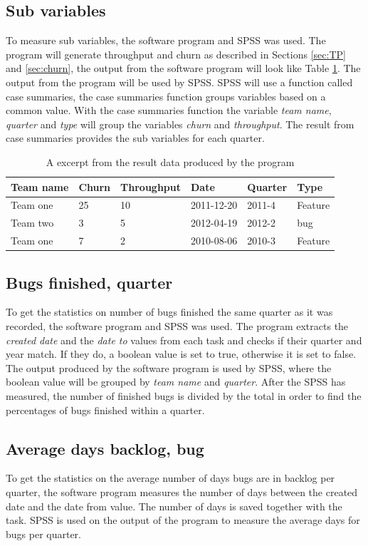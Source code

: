 \documentclass[UKenglish]{ifimaster}  %
\begin{document}
\subsection {Sub variables}
\label{sec:bug}
To measure sub variables, the software program and SPSS was used. The program will generate throughput and churn as described in Sections \ref{sec:TP} and \ref{sec:churn}, the output from the software program will look like Table \ref{tab:ftb}. The output from the program will be used by SPSS. SPSS will use a function called case summaries, the case summaries function groups variables based on a common value.  With the case summaries function the variable \textit{team name}, \textit{quarter} and \textit{type} will group the variables \textit{churn} and \textit{throughput}. The result from case summaries provides the sub variables for each quarter.
\begin{table}[!ht]
\center
\begin{tabular}{ | l | l | l | l | l |l | }
\hline
	\bf{Team name} & \bf{Churn} &\bf{Throughput} & \bf{Date} & \bf{Quarte}r & \bf{Type} \\ \hline
	Team one & 25 &10&2011-12-20& 2011-4 & Feature \\ \hline
	Team two & 3 &5&2012-04-19 & 2012-2 & bug \\ \hline
	Team one & 7 &2& 2010-08-06 & 2010-3 & Feature \\ \hline
\end{tabular}
\caption{A excerpt from the result data produced by the program }
\label{tab:ftb} 
\end{table}

\subsection{Bugs finished, quarter}
\label{sub:sec:bfq} 
To get the statistics on number of bugs finished the same quarter as it was recorded, the software program and SPSS was used. The program extracts the \textit{created date} and the \textit{date to} values from each task and checks if their quarter and year match. If they do, a boolean value is set to true, otherwise it is set to false. The output produced by the software program is used by SPSS, where the boolean value will be grouped by \textit{team name} and \textit{quarter}. After the SPSS has measured, the number of finished bugs is divided by the total in order to find the percentages of bugs finished within a quarter. 
\subsection{Average days backlog, bug}
\label{sub:sec:adbb}
To get the statistics on the average number of days bugs are in backlog per quarter, the software program measures the number of days between the created date and the date from value. The number of days is saved together with the task. SPSS is used on the output of the program to measure the average days for bugs per quarter.
\end{document}
